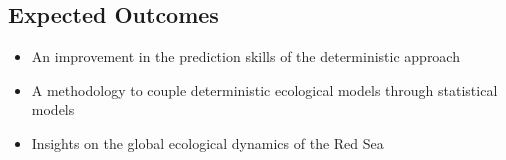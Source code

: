 \subsection{Expected Outcomes}

\begin{itemize}
\item An improvement in the prediction skills of the deterministic approach
\item A methodology to couple deterministic ecological models through statistical models
\item Insights on the global ecological dynamics of the Red Sea
\end{itemize}

